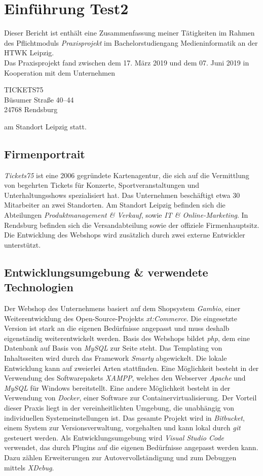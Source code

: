 \chapter{Einführung Test2}\label{ch:einführung}
Dieser Bericht ist enthält eine Zusammenfassung meiner Tätigkeiten im Rahmen des Pflichtmoduls \textit{Praxisprojekt} im Bachelorstudiengang Medieninformatik an der HTWK Leipzig.\\
Das Praxisprojekt fand zwischen dem 17. März 2019 und dem 07. Juni 2019 in Kooperation mit dem Unternehmen
\begin{center}
	TICKETS75\\
	Büsumer Straße 40–44\\
	24768 Rendsburg
\end{center}
am Standort Leipzig statt.

\section{Firmenportrait}
\textit{Tickets75} ist eine 2006 gegründete Kartenagentur, die sich auf die Vermittlung von begehrten Tickets für Konzerte, Sportveranstaltungen und Unterhaltungsshows spezialisiert hat.
Das Unternehmen beschäftigt etwa 30 Mitarbeiter an zwei Standorten. Am Standort Leipzig befinden sich die Abteilungen \textit{Produktmanagement \& Verkauf}, sowie \textit{IT \& Online-Marketing}. 
In Rendsburg befinden sich die Versandabteilung sowie der offiziele Firmenhauptsitz. Die Entwicklung des Webshops wird zusätzlich durch zwei externe Entwickler
unterstützt.

\section{Entwicklungsumgebung \& verwendete Technologien}
Der Webshop des Unternehmens basiert auf dem Shopsystem \textit{Gambio}, einer Weiterentwicklung des Open-Source-Projekts \textit{xt:Commerce}. 
Die eingesetzte Version ist stark an die eigenen Bedürfnisse angepasst und muss deshalb eigenständig weiterentwickelt werden. Basis des Webshops bildet \textit{php}, 
dem eine Datenbank auf Basis von \textit{MySQL} zur Seite steht. Das Templating von Inhaltsseiten wird durch das Framework \textit{Smarty} abgewickelt. 
Die lokale Entwicklung kann auf zweierlei Arten stattfinden. Eine Möglichkeit besteht in der Verwendung des Softwarepakets \textit{XAMPP}, 
welches den Webserver \textit{Apache} und \textit{MySQL} für Windows bereitstellt. Eine andere Möglichkeit besteht in der Verwendung von \textit{Docker}, 
einer Software zur Containervirtualisierung. Der Vorteil dieser Praxis liegt in der vereinheitlichten Umgebung, die unabhängig von individuellen Systemeinstellungen ist. 
Das gesamte Projekt wird in \textit{Bitbucket}, einem System zur Versionsverwaltung, vorgehalten und kann lokal durch \textit{git} gesteuert werden. 
Als Entwicklungsumgebung wird \textit{Visual Studio Code} verwendet, das durch Plugins auf die eigenen Bedürfnisse angepasst werden kann. 
Dazu zählen Erweiterungen zur Autovervollständigung und zum Debuggen mittels \textit{XDebug}.

